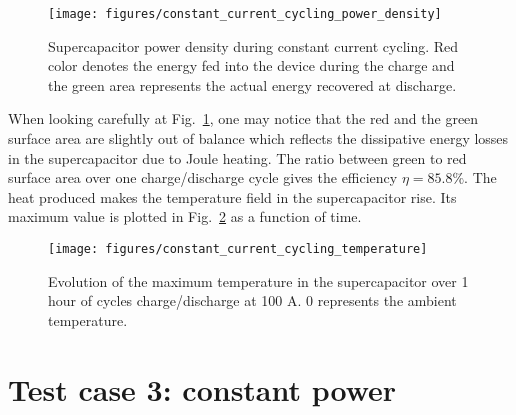 \documentclass[10pt, oneside]{article}   	%
\begin{document}
\begin{figure}[h!]
    \centering
    \texttt{[image: figures/constant\_current\_cycling\_power\_density]}
    \caption{Supercapacitor power density during constant current cycling.
Red color denotes the energy fed into the device during the charge and the
green area represents the actual energy recovered at discharge.
    }
    \label{fig:constant_current_cycling_power_density}
\end{figure}
When looking carefully at
Fig.~\ref{fig:constant_current_cycling_power_density}, one may notice that
the red and the green surface area are slightly out of balance which reflects
the dissipative energy losses in the supercapacitor due to Joule heating.
The ratio between green to red surface area over one charge/discharge cycle
gives the efficiency $\eta = 85.8\%$.  The heat produced makes the temperature
field in the supercapacitor rise.  Its maximum value is plotted in
Fig.~\ref{fig:constant_current_cycling_temperature} as a function of time.


\begin{figure}[h!]
    \centering
    \texttt{[image: figures/constant\_current\_cycling\_temperature]}
    \caption{Evolution of the maximum temperature in the supercapacitor over
1 hour of cycles charge/discharge at 100 A.  0 represents the ambient
temperature.
    }
    \label{fig:constant_current_cycling_temperature}
\end{figure}

\section{Test case 3: constant power}







\end{document}
